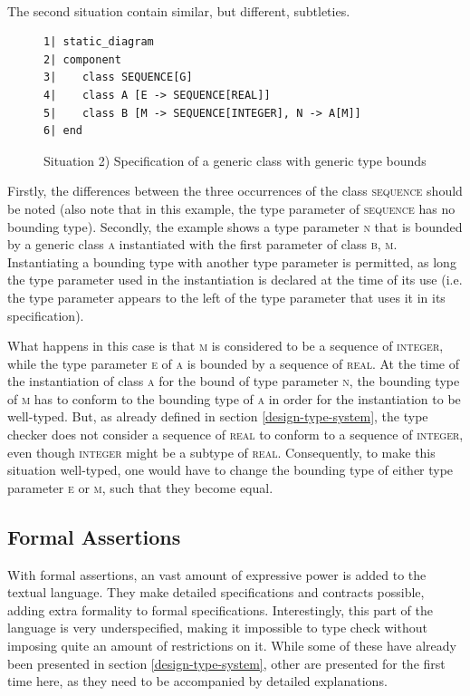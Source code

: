 \paragraph{} The second situation contain similar, but different, subtleties.
\begin{figure}[H]
{\footnotesize
\begin{verbatim}
1| static_diagram
2| component
3|    class SEQUENCE[G]
4|    class A [E -> SEQUENCE[REAL]]
5|    class B [M -> SEQUENCE[INTEGER], N -> A[M]] 
6| end
\end{verbatim}
}
\caption{Situation 2) Specification of a generic class with generic type bounds}
\label{fig:generic_type_bounds}
\end{figure}
Firstly, the differences between the three occurrences of the class \textsc{sequence} should be noted (also note that in this example, the type parameter of \textsc{sequence} has no bounding type). Secondly, the example shows a type parameter \textsc{n} that is bounded by a generic class \textsc{a} instantiated with the first parameter of class \textsc{b},  \textsc{m}. Instantiating a bounding type with another type parameter is permitted, as long the type parameter used in the instantiation is declared at the time of its use (i.e. the type parameter appears to the left of the type parameter that uses it in its specification).

What happens in this case is that \textsc{m} is considered to be a sequence of \textsc{integer}, while the type parameter \textsc{e} of \textsc{a} is bounded by a sequence of \textsc{real}. At the time of the instantiation of class \textsc{a} for the bound of type parameter \textsc{n}, the bounding type of \textsc{m} has to conform to the bounding type of \textsc{a} in order for the instantiation to be well-typed. But, as already defined in section \ref{design-type-system}, the type checker does not consider a sequence of \textsc{real} to conform to a sequence of \textsc{integer}, even though \textsc{integer} might be a subtype of \textsc{real}. Consequently, to make this situation well-typed, one would have to change the bounding type of either type parameter \textsc{e} or \textsc{m}, such that they become equal.

\subsection{Formal Assertions}
\label{implementataion-formal-assertions}
With formal assertions, an vast amount of expressive power is added to the textual \bon{} language. They make detailed specifications and contracts possible, adding extra formality to formal specifications. Interestingly, this part of the language is very underspecified, making it impossible to type check without imposing quite an amount of restrictions on it. While some of these have already been presented in section \ref{design-type-system}, other are presented for the first time here, as they need to be accompanied by detailed explanations.
\label{implementation-formal-assertions}

